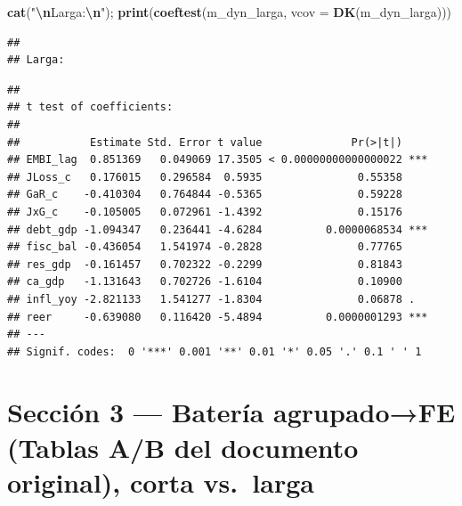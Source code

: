 \documentclass[
]{article}
\newenvironment{Shaded}{\begin{snugshade}}{\end{snugshade}}
\newcommand{\AttributeTok}[1]{\textcolor[rgb]{0.13,0.29,0.53}{#1}}
\newcommand{\FunctionTok}[1]{\textcolor[rgb]{0.13,0.29,0.53}{\textbf{#1}}}
\newcommand{\NormalTok}[1]{#1}
\newcommand{\SpecialCharTok}[1]{\textcolor[rgb]{0.81,0.36,0.00}{\textbf{#1}}}
\newcommand{\StringTok}[1]{\textcolor[rgb]{0.31,0.60,0.02}{#1}}
\begin{document}
\begin{Shaded}
\begin{Highlighting}[]
\FunctionTok{cat}\NormalTok{(}\StringTok{"}\SpecialCharTok{\textbackslash{}n}\StringTok{Larga:}\SpecialCharTok{\textbackslash{}n}\StringTok{"}\NormalTok{); }\FunctionTok{print}\NormalTok{(}\FunctionTok{coeftest}\NormalTok{(m\_dyn\_larga, }\AttributeTok{vcov =} \FunctionTok{DK}\NormalTok{(m\_dyn\_larga)))}
\end{Highlighting}
\end{Shaded}

\begin{verbatim}
## 
## Larga:
\end{verbatim}

\begin{verbatim}
## 
## t test of coefficients:
## 
##           Estimate Std. Error t value              Pr(>|t|)    
## EMBI_lag  0.851369   0.049069 17.3505 < 0.00000000000000022 ***
## JLoss_c   0.176015   0.296584  0.5935               0.55358    
## GaR_c    -0.410304   0.764844 -0.5365               0.59228    
## JxG_c    -0.105005   0.072961 -1.4392               0.15176    
## debt_gdp -1.094347   0.236441 -4.6284          0.0000068534 ***
## fisc_bal -0.436054   1.541974 -0.2828               0.77765    
## res_gdp  -0.161457   0.702322 -0.2299               0.81843    
## ca_gdp   -1.131643   0.702726 -1.6104               0.10900    
## infl_yoy -2.821133   1.541277 -1.8304               0.06878 .  
## reer     -0.639080   0.116420 -5.4894          0.0000001293 ***
## ---
## Signif. codes:  0 '***' 0.001 '**' 0.01 '*' 0.05 '.' 0.1 ' ' 1
\end{verbatim}

\section{Sección 3 --- Batería agrupado→FE (Tablas A/B del documento
original), corta
vs.~larga}\label{secciuxf3n-3-bateruxeda-agrupadofe-tablas-ab-del-documento-original-corta-vs.-larga}
\end{document}
